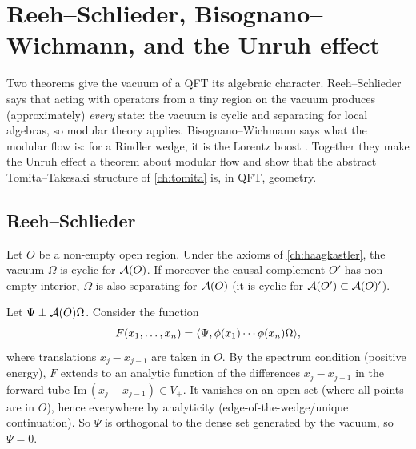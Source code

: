 \section{Reeh--Schlieder, Bisognano--Wichmann, and the Unruh effect}\label{ch:rs_bw}

\begin{physmotiv}
Two theorems give the vacuum of a QFT its algebraic character. Reeh--Schlieder says that acting with operators from a tiny region on the vacuum produces (approximately) \emph{every} state: the vacuum is cyclic and separating for local algebras, so modular theory applies. Bisognano--Wichmann says what the modular flow is: for a Rindler wedge, it is the Lorentz boost \cite{BisognanoWichmann1975,BisognanoWichmann1976}. Together they make the Unruh effect a theorem about modular flow and show that the abstract Tomita--Takesaki structure of \cref{ch:tomita} is, in QFT, geometry.
\end{physmotiv}

\subsection{Reeh--Schlieder}

\begin{theorem}
Let $O$ be a non-empty open region. Under the axioms of \cref{ch:haagkastler}, the vacuum $\Omega$ is cyclic for $\mathcal{A}(O)$. If moreover the causal complement $O'$ has non-empty interior, $\Omega$ is also separating for $\mathcal{A}(O)$ (it is cyclic for $\mathcal{A}(O')\subset\mathcal{A}(O)'$).
\end{theorem}

\begin{proofsketch}
Let $\Psi\perp\mathcal{A}(O)\Omega$. Consider the function \[F(x_1,\dots,x_n)=\langle \Psi,\phi(x_1)\cdots\phi(x_n)\Omega\rangle,\] where translations $x_j-x_{j-1}$ are taken in $O$. By the spectrum condition (positive energy), $F$ extends to an analytic function of the differences $x_j-x_{j-1}$ in the forward tube $\mathrm{Im}\,(x_j-x_{j-1})\in V_+$. It vanishes on an open set (where all points are in $O$), hence everywhere by analyticity (edge-of-the-wedge/unique continuation). So $\Psi$ is orthogonal to the dense set generated by the vacuum, so $\Psi=0$.
\end{proofsketch}

